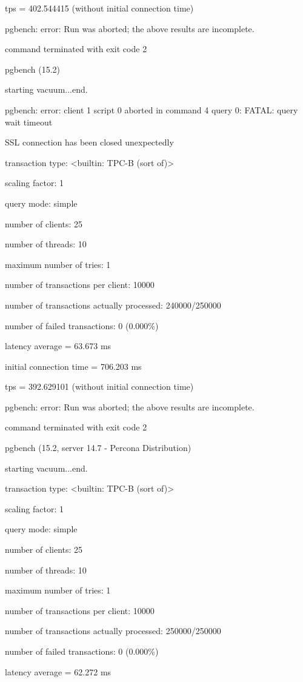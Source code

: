 tps = 402.544415 (without initial connection time)

pgbench: error: Run was aborted; the above results are incomplete.

command terminated with exit code 2

pgbench (15.2)

starting vacuum...end.

pgbench: error: client 1 script 0 aborted in command 4 query 0: FATAL:  query wait timeout

SSL connection has been closed unexpectedly

transaction type: <builtin: TPC-B (sort of)>

scaling factor: 1

query mode: simple

number of clients: 25

number of threads: 10

maximum number of tries: 1

number of transactions per client: 10000

number of transactions actually processed: 240000/250000

number of failed transactions: 0 (0.000\%)

latency average = 63.673 ms

initial connection time = 706.203 ms

tps = 392.629101 (without initial connection time)

pgbench: error: Run was aborted; the above results are incomplete.

command terminated with exit code 2


pgbench (15.2, server 14.7 - Percona Distribution)

starting vacuum...end.

transaction type: <builtin: TPC-B (sort of)>

scaling factor: 1

query mode: simple

number of clients: 25

number of threads: 10

maximum number of tries: 1

number of transactions per client: 10000

number of transactions actually processed: 250000/250000

number of failed transactions: 0 (0.000\%)

latency average = 62.272 ms

